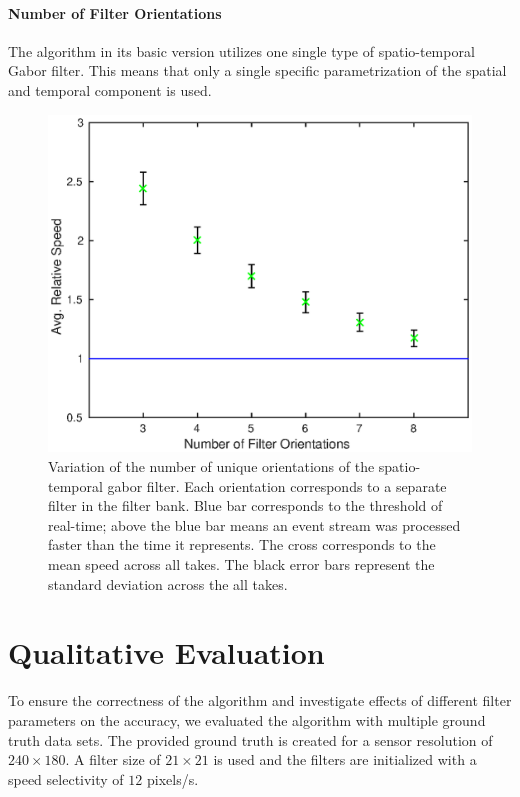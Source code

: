\paragraph{Number of Filter Orientations}
The algorithm in its basic version utilizes one single type of spatio-temporal Gabor filter.
This means that only a single specific parametrization of the spatial and temporal component is used.
\begin{figure}[!htb]
	\centering
	\includegraphics[scale=.9]{gpu_fo.eps}
	\caption{Variation of the number of unique orientations of the spatio-temporal gabor filter. Each orientation corresponds to a separate filter in the filter bank. Blue bar corresponds to the threshold of real-time; above the blue bar means an event stream was processed faster than the time it represents. The cross corresponds to the mean speed across all takes. The black error bars represent the standard deviation across the all takes.}
	\label{fig:gpu_fo}
\end{figure}

\section{Qualitative Evaluation} 
To ensure the correctness of the algorithm and investigate effects of different filter parameters on the accuracy, we evaluated the algorithm with multiple ground truth data sets.
The provided ground truth is created for a sensor resolution of $240\times180$.
A filter size of $21\times21$ is used and the filters are initialized with a speed selectivity of $12$ pixels/s. 


